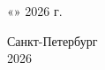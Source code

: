 \begin{titlepage}
        \vspace{1cm}
        
        \begin{flushright}
            \large
            «\underline{\hspace{1cm}}» \underline{\hspace{3cm}} 2026 г.
        \end{flushright}
        
        \vspace{0.5cm}
        
        \vfill
        
        \begin{center}
            Санкт-Петербург \\
            2026
        \end{center}   
            
    \end{titlepage}
    
    \setcounter{page}{2}  